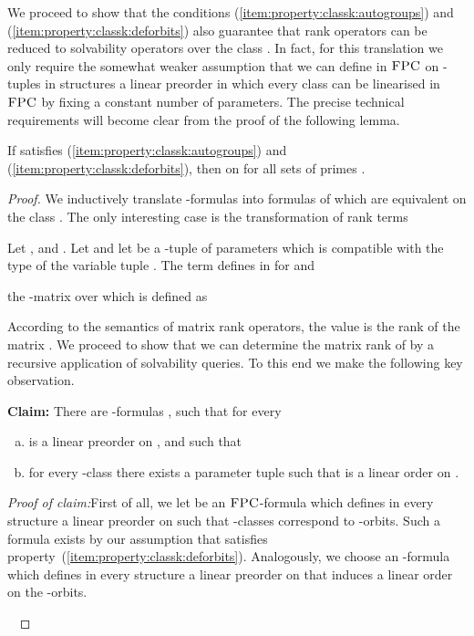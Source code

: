 \documentclass[a4paper,UKenglish]{lipics}
\newcommand{\logic}[1]{\ensuremath{\textsc{#1}}\xspace}
\newcommand{\FPC}{\logic{FPC}}
\theoremstyle{plain}
\newenvironment{claim}[1]{\par\noindent\textbf{Claim:}\space 
{#1}}{}
\newenvironment{claimproof}[1]{\par\noindent\textit{Proof of 
claim:}\space#1}
{\leavevmode\unskip\penalty9999 \hbox{}\nobreak\hfill\quad\hbox{
}}
\begin{document}
\bigskip
We proceed to show that the conditions 
(\ref{item:property:classk:autogroups}) and
 (\ref{item:property:classk:deforbits}) also  guarantee that 
rank operators can be reduced to solvability operators over the class 
. In fact, for this translation we only require the somewhat weaker 
assumption that we can define in \FPC on -tuples in 
structures  a linear preorder in which every class can be 
linearised in \FPC by fixing a constant number of parameters. 
The precise technical requirements will become clear from the proof of the 
following lemma.
\begin{lemma}\label{lemma:rank:to:solve}
If  satisfies (\ref{item:property:classk:autogroups})
 and (\ref{item:property:classk:deforbits}), then
  on  for all sets of primes .
\end{lemma}
\begin{proof}
 We inductively translate -formulas into formulas of 
 which 
are equivalent on the class . The only interesting case is 
the transformation of rank terms


Let ,  
and 
. Let  and let  be a -tuple of 
parameters  which 
is compatible with the type of the variable tuple . 
The term  defines in  
for  and 

the -matrix  over  which is defined as


According to the semantics of matrix rank operators, the 
value  is the rank of the matrix .
We proceed to show that we can determine the matrix rank of  by a 
recursive application of solvability queries. To this end we make the 
following key observation.

\medskip
\begin{claim}
 There are -formulas , 
 such that for every 

\begin{enumerate}[(a)]
 \item  is a linear preorder  on 
, and such that
 \item for every -class  there exists a 
parameter tuple  such that  is 
a linear order  on .
\end{enumerate}
\end{claim}
\begin{claimproof}
 First of all, we let  be an \FPC-formula which defines in 
every structure  a linear preorder  on  
such that -classes correspond to -orbits. Such a 
formula exists by our assumption that  satisfies 
property~(\ref{item:property:classk:deforbits}).
Analogously, we choose an -formula  which defines 
in every structure  a linear preorder  on 
 that induces a linear order on the 
-orbits.


\end{claimproof}
\end{proof}
\end{document}
